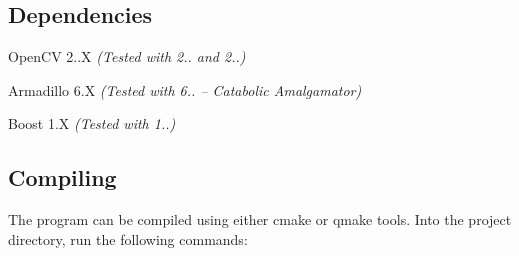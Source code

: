 \hypertarget{index_dependencies_sec}{}\subsection{Dependencies}\label{index_dependencies_sec}
\begin{DoxyItemize}
\item Open\+CV 2..\+X {\itshape (Tested with 2.. and 2..)} \item Armadillo 6.\+X {\itshape (Tested with 6.. -- Catabolic Amalgamator)} \item Boost 1.\+X {\itshape (Tested with 1..)}\end{DoxyItemize}
\hypertarget{index_compiling_sec}{}\subsection{Compiling}\label{index_compiling_sec}
The program can be compiled using either {\ttfamily cmake} or {\ttfamily qmake} tools. Into the project directory, run the following commands\+:

